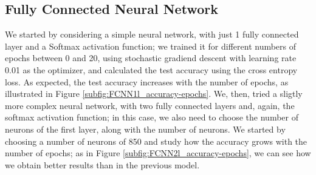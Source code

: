 \documentclass[12pt]{article}
\begin{document}
\subsection{Fully Connected Neural Network}
We started by considering a simple neural network, with just 1 fully connected layer and a Softmax activation function; we trained it for different numbers of epochs between 0 and 20, using stochastic gradiend descent with learning rate 0.01 as the optimizer, and calculated the test accuracy using the cross entropy loss. As expected, the test accuracy increases with the number of epochs, as illustrated in Figure \ref{subfig:FCNN1l_accuracy-epochs}.\newline
We, then, tried a sligtly more complex neural network, with two fully connected layers and, again, the softmax activation function; in this case, we also need to choose the number of neurons of the first %
layer, along with the number of neurons. We started by choosing a number of neurons of 850 and study how the accuracy grows with the number of epochs; as in Figure \ref{subfig:FCNN2l_accuracy-epochs}, we can see how we obtain better results than in the previous model.\newline
\end{document}
